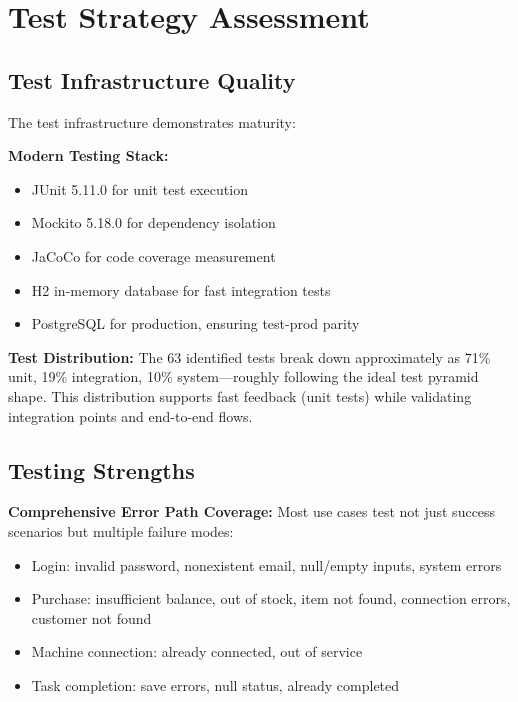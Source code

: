 \documentclass[11pt,a4paper]{article}
\begin{document}
\section{Test Strategy Assessment}

\subsection{Test Infrastructure Quality}

The test infrastructure demonstrates maturity:

\textbf{Modern Testing Stack:}
\begin{itemize}
    \item JUnit 5.11.0 for unit test execution
    \item Mockito 5.18.0 for dependency isolation
    \item JaCoCo for code coverage measurement
    \item H2 in-memory database for fast integration tests
    \item PostgreSQL for production, ensuring test-prod parity
\end{itemize}

\textbf{Test Distribution:} The 63 identified tests break down approximately as 71\% unit, 19\% integration, 10\% system—roughly following the ideal test pyramid shape. This distribution supports fast feedback (unit tests) while validating integration points and end-to-end flows.

\subsection{Testing Strengths}

\textbf{Comprehensive Error Path Coverage:} Most use cases test not just success scenarios but multiple failure modes:
\begin{itemize}
    \item Login: invalid password, nonexistent email, null/empty inputs, system errors
    \item Purchase: insufficient balance, out of stock, item not found, connection errors, customer not found
    \item Machine connection: already connected, out of service
    \item Task completion: save errors, null status, already completed
\end{itemize}
\end{document}
